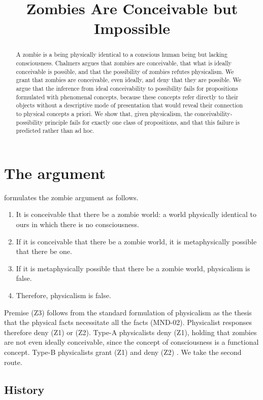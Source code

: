 \documentclass{situationist-preprint}
\title{Zombies Are Conceivable but Impossible}
\begin{document}
\maketitle

\begin{abstract}
A zombie is a being physically identical to a conscious human being but lacking consciousness. Chalmers argues that zombies are conceivable, that what is ideally conceivable is possible, and that the possibility of zombies refutes physicalism. We grant that zombies are conceivable, even ideally, and deny that they are possible. We argue that the inference from ideal conceivability to possibility fails for propositions formulated with phenomenal concepts, because these concepts refer directly to their objects without a descriptive mode of presentation that would reveal their connection to physical concepts a priori. We show that, given physicalism, the conceivability-possibility principle fails for exactly one class of propositions, and that this failure is predicted rather than ad hoc.
\end{abstract}

\section{The argument}

\citet{Chalmers1996} formulates the zombie argument as follows.
\begin{enumerate}[label=(Z\arabic*)]
\item It is conceivable that there be a zombie world: a world physically identical to ours in which there is no consciousness.
\item If it is conceivable that there be a zombie world, it is metaphysically possible that there be one.
\item If it is metaphysically possible that there be a zombie world, physicalism is false.
\item Therefore, physicalism is false.
\end{enumerate}
Premise (Z3) follows from the standard formulation of physicalism as the thesis that the physical facts necessitate all the facts (MND-02). Physicalist responses therefore deny (Z1) or (Z2). Type-A physicalists deny (Z1), holding that zombies are not even ideally conceivable, since the concept of consciousness is a functional concept. Type-B physicalists grant (Z1) and deny (Z2) \citep{Chalmers2002}. We take the second route.

\subsection{History}
\end{document}
